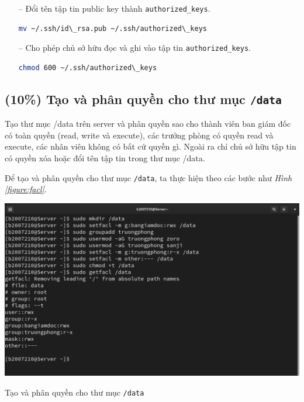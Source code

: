 \documentclass[a4paper, 11pt]{article}
\begin{document}
\begin{enumerate}
          \begin{itemize}
              \item[--] Đổi tên tập tin public key thành \texttt{authorized\_keys}.
                    \begin{lstlisting}[language=bash, caption=Đổi tên tập tin public key]
mv ~/.ssh/id\_rsa.pub ~/.ssh/authorized\_keys
\end{lstlisting}
              \item[--] Cho phép chủ sở hữu đọc và ghi vào tập tin \texttt{authorized\_keys}.
                    \begin{lstlisting}[language=bash, caption=Phân quyền cho tập tin \texttt{authorized\_keys}]
chmod 600 ~/.ssh/authorized\_keys
\end{lstlisting}
          \end{itemize}
\end{enumerate}

\subsection{(10\%) Tạo và phân quyền cho thư mục \texttt{/data}}

Tạo thư mục /data trên server và phân quyền sao cho thành viên ban giám đốc có toàn quyền (read, write và execute), các trưởng phòng có quyền read và execute, các nhân viên không có bất cứ quyền gì. Ngoài ra chỉ chủ sở hữu tập tin có quyền xóa hoặc đổi tên tập tin trong thư mục /data.


Để tạo và phân quyền cho thư mục \texttt{/data}, ta thực hiện theo các bước như \textit{Hình \ref{figure:facl}}.

\begin{minipage}
    {\linewidth}
    \captionsetup{type=figure}
    \centering
    \includegraphics[width=\linewidth]{images/facl.png}
    \caption{Tạo và phân quyền cho thư mục \texttt{/data}}
    \label{figure:facl}
\end{minipage}
\end{document}
